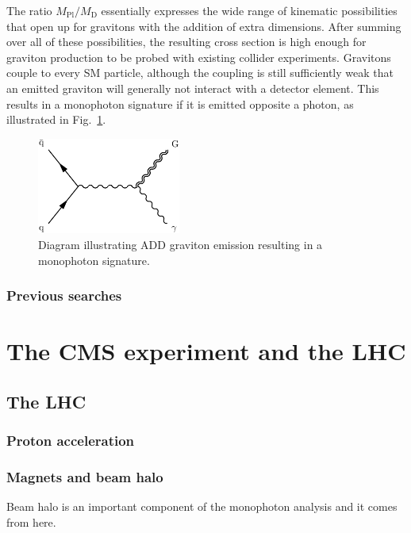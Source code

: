 \documentclass[oneside, letterpaper, 12pt, oldfontcommands]{memoir}
\begin{document}
The ratio $M_\mathrm{Pl} / M_\mathrm{D}$ essentially expresses the wide range of kinematic possibilities that open up for gravitons with the addition
of extra dimensions. After summing over all of these possibilities, the resulting
cross section is high enough for graviton production to be probed with existing collider experiments.
Gravitons couple to every SM particle, although the coupling is still sufficiently weak that an emitted graviton will generally not interact with a detector element.
This results in a monophoton signature if it is emitted opposite a photon, as illustrated in Fig.~\ref{fig:add_diagram}.

\begin{figure}[hbtp]
  \begin{center}
    \includegraphics[width=0.42\textwidth]{Figures/add.pdf}
    \caption{
      Diagram illustrating ADD graviton emission resulting in a monophoton signature.
    }
    \label{fig:add_diagram}
  \end{center}
\end{figure}

\subsection{Previous searches} \label{sec:introduction_ADD_previous_searches}

\chapter{The CMS experiment and the LHC} \label{chap:LHCCMS}
\section{The LHC} \label{sec:LHCCMS_LHC}
\subsection{Proton acceleration} \label{sec:LHCCMS_LHC_proton_acceleration}
\subsection{Magnets and beam halo} \label{sec:LHCCMS_LHC_magnets_beam_halo}
Beam halo is an important component of the monophoton analysis and it comes from here.
\end{document}
